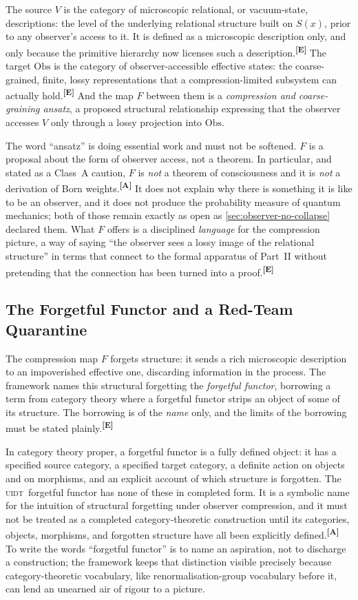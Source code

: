\documentclass[12pt,a4paper,twoside]{article}
\theoremstyle{plain}
\theoremstyle{definition}
\theoremstyle{remark}
\newcommand{\UIDT}{\textsc{uidt}}
\newcommand{\catmark}[1]{\textsuperscript{\textsf{\textbf{[#1]}}}}
\begin{document}
The source $V$ is the category of microscopic relational, or vacuum-state, descriptions: the level of the underlying relational structure built on $S(x)$, prior to any observer's access to it. It is defined as a microscopic description only, and only because the primitive hierarchy now licenses such a description.\catmark{E} The target $\mathrm{Obs}$ is the category of observer-accessible effective states: the coarse-grained, finite, lossy representations that a compression-limited subsystem can actually hold.\catmark{E} And the map $F$ between them is a \emph{compression and coarse-graining ansatz}, a proposed structural relationship expressing that the observer accesses $V$ only through a lossy projection into $\mathrm{Obs}$.

The word ``ansatz'' is doing essential work and must not be softened. $F$ is a proposal about the form of observer access, not a theorem. In particular, and stated as a Class~A caution, $F$ is \emph{not} a theorem of consciousness and it is \emph{not} a derivation of Born weights.\catmark{A} It does not explain why there is something it is like to be an observer, and it does not produce the probability measure of quantum mechanics; both of those remain exactly as open as \cref{sec:observer-no-collapse} declared them. What $F$ offers is a disciplined \emph{language} for the compression picture, a way of saying ``the observer sees a lossy image of the relational structure'' in terms that connect to the formal apparatus of Part~II without pretending that the connection has been turned into a proof.\catmark{E}

\subsection{The Forgetful Functor and a Red-Team Quarantine}
\label{subsec:forgetful-functor}

The compression map $F$ forgets structure: it sends a rich microscopic description to an impoverished effective one, discarding information in the process. The framework names this structural forgetting the \emph{forgetful functor}, borrowing a term from category theory where a forgetful functor strips an object of some of its structure. The borrowing is of the \emph{name} only, and the limits of the borrowing must be stated plainly.\catmark{E}

In category theory proper, a forgetful functor is a fully defined object: it has a specified source category, a specified target category, a definite action on objects and on morphisms, and an explicit account of which structure is forgotten. The \UIDT\ forgetful functor has none of these in completed form. It is a symbolic name for the intuition of structural forgetting under observer compression, and it must not be treated as a completed category-theoretic construction until its categories, objects, morphisms, and forgotten structure have all been explicitly defined.\catmark{A} To write the words ``forgetful functor'' is to name an aspiration, not to discharge a construction; the framework keeps that distinction visible precisely because category-theoretic vocabulary, like renormalisation-group vocabulary before it, can lend an unearned air of rigour to a picture.
\end{document}

